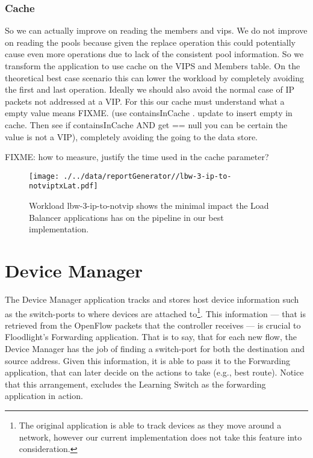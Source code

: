 \subsubsection{Cache}
So we can actually improve on reading the members and vips.  We do not
improve on reading the pools because given the replace operation this
could potentially cause even more operations due to lack of the
consistent pool information. So we transform the application to use
cache on the VIPS and Members  table. On the theoretical best case scenario this
can lower the workload by completely avoiding the first and last
operation. Ideally we should also avoid the normal case of IP packets
not addressed at a VIP. For this our cache  must understand what a
empty value means FIXME. (use containsInCache . update to insert empty
in cache. Then see if containsInCache AND get == null you can be
certain the value is not a VIP), completely avoiding the going to the
data store. 

FIXME: how to measure, justify the time used in the cache parameter? 

\begin{figure}[ht]
\centering
\texttt{[image: ./../data/reportGenerator//lbw-3-ip-to-notviptxLat.pdf]}
\caption[Minimum impact of Load Balancer in the pipeline.]{Workload
  lbw-3-ip-to-notvip shows the minimal impact the Load Balancer
  applications has on the pipeline in our best implementation.}
\end{figure}


\section{Device Manager}
\label{sec:feasibility:dm}
\glsresetall

The Device Manager application tracks  and stores host device
information such as the switch-ports to where devices are
attached to\footnote{The original application is able to track devices as
  they move around a network, however our current implementation does
  not take this feature into consideration.}. This information ---
that is retrieved from the OpenFlow packets that the controller receives --- is crucial to
Floodlight’s Forwarding application. That is to say, that for  each new flow, the Device
Manager has the job of finding a switch-port for both the destination
and source address. Given this information, it is able to pass it to
the Forwarding application, that can later decide on the actions to
take (e.g., best route). Notice that this arrangement, excludes the
Learning Switch as the  forwarding application in action. 

